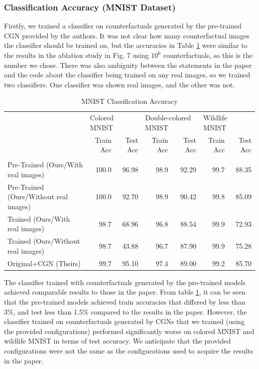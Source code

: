\subsubsection{Classification Accuracy (MNIST Dataset)}
Firstly, we trained a classifier on counterfactuals generated by the pre-trained CGN provided by the authors. It was not clear how many counterfactual images the classifier should be trained on, but the accuracies in Table \ref{table:mnist-classification} were similar to the results in the ablation study in Fig. 7 using $10^6$ counterfactuals, so this is the number we chose. There was also ambiguity between the statements in the paper and the code about the classifier being trained on any real images, so we trained two classifiers. One classifier was shown real images, and the other was not. 
\\
\begin{table}[h]
\centering
\tiny
\begin{tabular}{lrrrrrr}
\toprule
{} & \multicolumn{2}{l}{Colored MNIST} & \multicolumn{2}{l}{Double-colored MNIST} & \multicolumn{2}{l}{Wildlife MNIST} \\
{} &     Train Acc & Test Acc &            Train Acc & Test Acc &      Train Acc & Test Acc \\
                                       &               &          &                      &          &                &          \\
\midrule
Pre-Trained (Ours/With real images)    &         100.0 &    96.98 &                 98.9 &    92.29 &           99.7 &    88.35 \\
Pre-Trained (Ours/Without real images) &         100.0 &    92.70 &                 98.9 &    90.42 &           99.8 &    85.09 \\
Trained (Ours/With real images)        &          98.7 &    68.96 &                 96.8 &    88.54 &           99.9 &    72.93 \\
Trained (Ours/Without real images)     &          98.7 &    43.88 &                 96.7 &    87.90 &           99.9 &    75.28 \\
Original+CGN (Theirs)                               &          99.7 &    95.10 &                 97.4 &    89.00 &           99.2 &    85.70 \\
\bottomrule
\end{tabular}
\caption {MNIST Classification Accuracy}
\label{table:mnist-classification}
\end{table}
The classifier trained with counterfactuals generated by the pre-trained models achieved comparable results to those in the paper. From table \ref{table:mnist-classification}, it can be seen that the pre-trained models achieved train accuracies that differed by less than 3\%, and test less than 1.5\% compared to the results in the paper. However, the classifier trained on counterfactuals generated by CGNs that we trained (using the provided configurations) performed significantly worse on colored MNIST and wildlife MNIST in terms of test accuracy. We anticipate that the provided configurations were not the same as the configurations used to acquire the results in the paper. 



